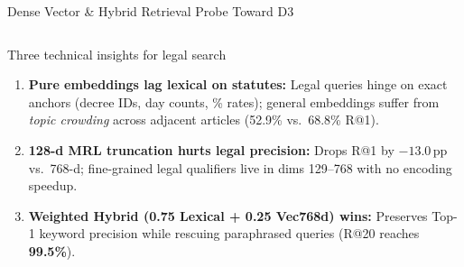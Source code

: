 \documentclass[aspectratio=1610,11pt]{beamer}
\newcommand{\pp}{\,pp\xspace}
\begin{document}
\begin{frame}{Dense Vector \& Hybrid Retrieval Probe Toward D3}
\begin{columns}[T]
    \begin{alertblock}{Three technical insights for legal search}
      \scriptsize
      \begin{enumerate}\scriptsize
        \item \textbf{Pure embeddings lag lexical on statutes:} Legal queries hinge on exact anchors (decree IDs, day counts, \% rates); general embeddings suffer from \emph{topic crowding} across adjacent articles (52.9\% vs.\ 68.8\% R@1).
        \item \textbf{128-d MRL truncation hurts legal precision:} Drops R@1 by $-13.0$\pp vs.\ 768-d; fine-grained legal qualifiers live in dims 129--768 with no encoding speedup.
        \item \textbf{Weighted Hybrid (0.75 Lexical + 0.25 Vec768d) wins:} Preserves Top-1 keyword precision while rescuing paraphrased queries (R@20 reaches \textbf{99.5\%}).
      \end{enumerate}
    \end{alertblock}
  \end{columns}
\end{frame}
\end{document}
